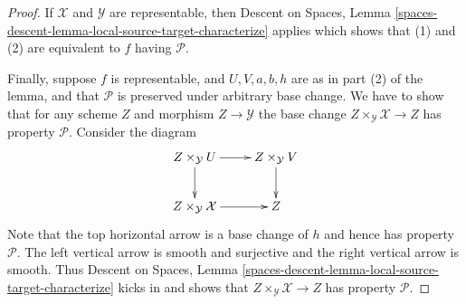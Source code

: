 \documentclass[10pt,a4paper]{amsart}
\theoremstyle{plain}
\theoremstyle{definition}
\theoremstyle{remark}
\numberwithin{equation}{subsection}
\begin{document}
\begin{proof}
\medskip\noindent
If $\mathcal{X}$ and $\mathcal{Y}$ are representable, then
Descent on Spaces,
Lemma \ref{spaces-descent-lemma-local-source-target-characterize}
applies which shows that (1) and (2) are equivalent to $f$ having
$\mathcal{P}$.

\medskip\noindent
Finally, suppose $f$ is representable, and $U, V, a, b, h$ are
as in part (2) of the lemma, and that $\mathcal{P}$ is preserved under
arbitrary base change. We have to show that for any scheme
$Z$ and morphism $Z \to \mathcal{Y}$ the base change
$Z \times_\mathcal{Y} \mathcal{X} \to Z$
has property $\mathcal{P}$. Consider the diagram
$$
\xymatrix{
Z \times_\mathcal{Y} U \ar[d] \ar[r] &
Z \times_\mathcal{Y} V \ar[d] \\
Z \times_\mathcal{Y} \mathcal{X} \ar[r] &
Z
}
$$
Note that the top horizontal arrow is a base change of $h$ and
hence has property $\mathcal{P}$. The left vertical arrow is smooth
and surjective and the right vertical arrow is smooth. Thus
Descent on Spaces,
Lemma \ref{spaces-descent-lemma-local-source-target-characterize}
kicks in and shows that $Z \times_\mathcal{Y} \mathcal{X} \to Z$
has property $\mathcal{P}$.
\end{proof}
\end{document}
